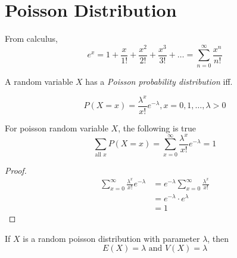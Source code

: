 \section{Poisson Distribution}
\begin{theorem}
    From calculus,
    \[
    e^x = 1 + \frac{x}{1!}  + \frac{x^2}{2!} + \frac{x^3}{3!} + \ldots = \sum^\infty_{n=0} \frac{x^n}{n!}
    \]
\end{theorem}
\begin{definition}
    A random variable $X$ has a \emph{Poisson probability distribution} iff.
    
    \[
    P(X=x) = \frac{\lambda^x}{x!}e^{-\lambda}, x = 0, 1, \ldots, \lambda > 0    
    \]
\end{definition}

\begin{corollary}\label{thm:poi_sum_to_one}
    For poisson random variable $X$, the following is true
    \[
    \sum_{\text{all } x} P(X = x) = \sum^\infty_{x = 0} \frac{\lambda^x}{x!}e^{-\lambda}   = 1
    \]
\end{corollary}
\begin{proof}
    \begin{align*}
    \sum^\infty_{x = 0} \frac{\lambda^x}{x!}e^{-\lambda} &= e^{-\lambda}\sum^\infty_{x = 0} \frac{\lambda^x}{x!} \\
    &= e^{-\lambda} \cdot e^{\lambda} \\
    &= 1
    \end{align*} 
\end{proof}

\begin{theorem}
    If $X$ is a random poisson distribution with parameter $\lambda$, then
    \[
        E(X) = \lambda \text{ and } V(X) = \lambda
    \]
\end{theorem}

